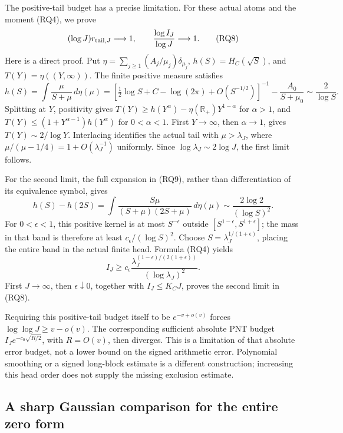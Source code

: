 \documentclass[11pt]{article}
\theoremstyle{remark}\newtheorem{remark}[theorem]{Remark}
\begin{document}
The positive-tail budget has a precise limitation. For these actual
atoms and the moment (RQ4), we prove
\[
 (\log J)r_{{\rm tail},J}\longrightarrow1,\qquad
             \frac{\log I_J}{\log J}\longrightarrow1. \tag{RQ8}
\]
Here is a direct proof. Put
\(\eta=\sum_{j\ge1}(A_j/\mu_j)\delta_{\mu_j}\),
\(h(S)=H_C(\sqrt S)\), and \(T(Y)=\eta((Y,\infty))\).
The finite positive measure satisfies
\[
 h(S)=\int\frac{\mu}{S+\mu}\,d\eta(\mu)
 =[\tfrac12\log S+C-\log(2\pi)+O(S^{-1/2})]^{-1}
                    -\frac{A_0}{S+\mu_0}\sim\frac2{\log S}. \tag{RQ9}
\]
Splitting at \(Y\), positivity gives
\(T(Y)\ge h(Y^\alpha)-\eta(\mathbb R_+)Y^{1-\alpha}\) for
\(\alpha>1\), and
\(T(Y)\le(1+Y^{\alpha-1})h(Y^\alpha)\) for \(0<\alpha<1\).
First \(Y\to\infty\), then \(\alpha\to1\), gives
\(T(Y)\sim2/\log Y\).
Interlacing identifies the actual tail with \(\mu>\lambda_J\),
where \(\mu/(\mu-1/4)=1+O(\lambda_J^{-1})\) uniformly.
Since \(\log\lambda_J\sim2\log J\), the first limit follows.

For the second limit, the full expansion in (RQ9), rather than
differentiation of its equivalence symbol, gives
\[
 h(S)-h(2S)
 =\int\frac{S\mu}{(S+\mu)(2S+\mu)}\,d\eta(\mu)
                  \sim\frac{2\log2}{(\log S)^2}.   \tag{RQ10}
\]
For \(0<\epsilon<1\), this positive kernel is at most
\(S^{-\epsilon}\) outside
\([S^{1-\epsilon},S^{1+\epsilon}]\); the mass in that band is
therefore at least \(c_\epsilon/(\log S)^2\).
Choose \(S=\lambda_J^{1/(1+\epsilon)}\), placing the entire band
in the actual finite head. Formula (RQ4) yields
\[
 I_J\ge c_\epsilon
 \frac{\lambda_J^{(1-\epsilon)/(2(1+\epsilon))}}
                             {(\log\lambda_J)^2}. \tag{RQ11}
\]
First \(J\to\infty\), then \(\epsilon\downarrow0\), together with
\(I_J\le K_CJ\), proves the second limit in (RQ8).

Requiring this positive-tail budget itself to be \(e^{-v+o(v)}\)
forces \(\log\log J\ge v-o(v)\). The corresponding sufficient
absolute PNT budget \(I_Je^{-c_0\sqrt{R/2}}\), with \(R=O(v)\),
then diverges. This is a limitation of that absolute error
budget, not a lower bound on the signed arithmetic error.
Polynomial smoothing or a signed long-block estimate is a
different construction; increasing this head order does not
supply the missing exclusion estimate.


\subsection{A sharp Gaussian comparison for the entire zero form}
\label{sec:sharp-gaussian-rest}
\end{document}
